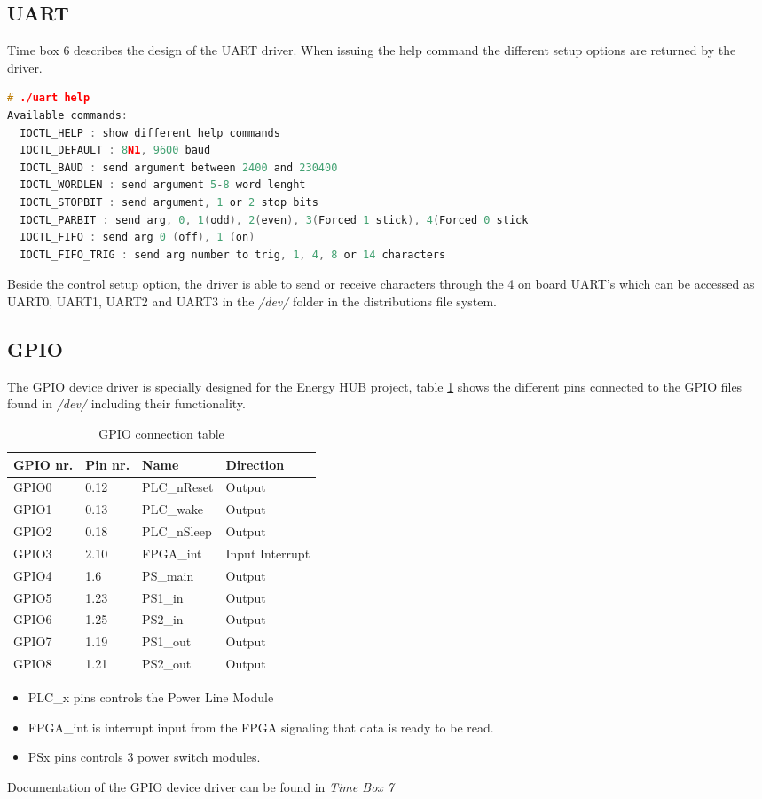 \subsection{UART}
Time box 6 describes the design of the UART driver. When issuing the help command the different setup options are returned by the driver.
\begin{lstlisting}[language=c, caption=UART help command]
# ./uart help
Available commands:
  IOCTL_HELP : show different help commands
  IOCTL_DEFAULT : 8N1, 9600 baud
  IOCTL_BAUD : send argument between 2400 and 230400
  IOCTL_WORDLEN : send argument 5-8 word lenght
  IOCTL_STOPBIT : send argument, 1 or 2 stop bits
  IOCTL_PARBIT : send arg, 0, 1(odd), 2(even), 3(Forced 1 stick), 4(Forced 0 stick
  IOCTL_FIFO : send arg 0 (off), 1 (on)
  IOCTL_FIFO_TRIG : send arg number to trig, 1, 4, 8 or 14 characters
\end{lstlisting}
Beside the control setup option, the driver is able to send or receive characters through the 4 on board UART's which can be accessed as UART0, UART1, UART2 and UART3 in the \textit{/dev/} folder in the distributions file system.
\subsection{GPIO}
The GPIO device driver is specially designed for the Energy HUB project, table \ref{tab:gpio_table} shows the different pins connected to the GPIO files found in \textit{/dev/} including their functionality.
\begin{table}[H]
	\centering
	\begin{tabular}{|p{2cm}|p{2cm}|p{3cm}|p{3cm}|}\hline
		GPIO nr.		& Pin nr.		& Name			& Direction		\\\hline
		GPIO0		& 0.12		& PLC\_nReset		& Output			\\\hline
		GPIO1		& 0.13		& PLC\_wake		& Output			\\\hline
		GPIO2		& 0.18		& PLC\_nSleep		& Output			\\\hline
		GPIO3		& 2.10		& FPGA\_int		& Input Interrupt	\\\hline
		GPIO4		& 1.6			& PS\_main		& Output			\\\hline
		GPIO5		& 1.23		& PS1\_in			& Output			\\\hline
		GPIO6		& 1.25		& PS2\_in			& Output			\\\hline
		GPIO7		& 1.19		& PS1\_out		& Output			\\\hline
		GPIO8		& 1.21		& PS2\_out		& Output			\\\hline
	\end{tabular}
	\caption{GPIO connection table}
	\label{tab:gpio_table}
\end{table}
\begin{itemize}
	\item PLC\_x pins controls the Power Line Module
	\item FPGA\_int is interrupt input from the FPGA signaling that data is ready to be read.
	\item PSx pins controls 3 power switch modules.
\end{itemize}
Documentation of the GPIO device driver can be found in \textit{Time Box 7}
